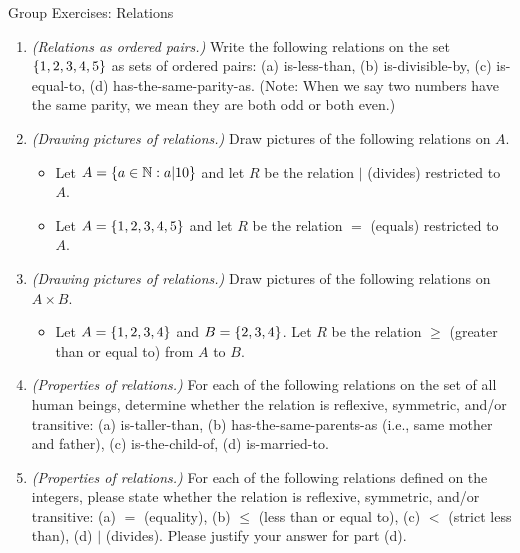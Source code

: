 \documentclass[10pt]{beamer}
\begin{document}
\begin{frame}{Group Exercises: Relations}
\footnotesize 
\begin{enumerate}
	\item \textit{(Relations as ordered pairs.)}  Write the following relations on the set $\{ {1,2,3,4,5} \}$ as sets of ordered pairs: (a) is-less-than, (b) is-divisible-by, (c) is-equal-to, (d) has-the-same-parity-as.  (Note: When we say two numbers have the same parity, we mean they are both odd or both even.)
\item \textit{(Drawing pictures of relations.)} 
	Draw pictures of the following relations on $A$. 
	\begin{itemize} \footnotesize 
		\item[a.] Let $A=\{ {a \in \mathbb{N} : a|10} \}$ and let $R$ be the relation $|$ (divides) restricted to $A$. 
		\item[b.] Let $A=\{ {1,2,3,4,5} \}$ and let $R$ be the relation  $=$ (equals) restricted to $A$.
	\end{itemize}
\item \textit{(Drawing pictures of relations.)}  Draw pictures of the following relations on $A \times B$.
	\begin{itemize} \footnotesize 
		 \item[a.] Let $A=\{ {1,2,3,4} \}$ and $B = \{ {2,3,4} \}$. Let $R$ be the relation $\geq$ (greater than or equal to) from $A$ to $B$.
	\end{itemize}

	
	\item \textit{(Properties of relations.)} For each of the following relations on the set of all human beings, determine whether the relation is reflexive, symmetric, and/or transitive: (a) is-taller-than, (b) has-the-same-parents-as (i.e., same mother and father), (c)  is-the-child-of, (d) is-married-to.

	\item \textit{(Properties of relations.)}  For each of the following relations defined on the integers, please state whether the relation is reflexive, symmetric, and/or transitive: (a) $=$ (equality), (b) $\leq$ (less than or equal to), (c) $<$ (strict less than), (d) $|$ (divides). Please justify your answer for part (d).
	
\end{enumerate}
\end{frame}
\end{document}
